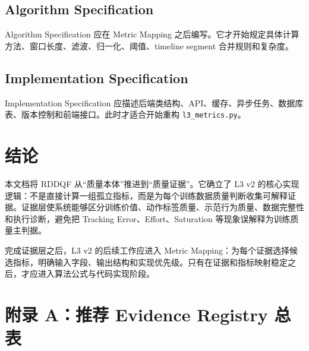 \documentclass[UTF8,zihao=-4]{ctexart}
\newcommand{\Code}[1]{\texttt{#1}}
\begin{document}
\subsection{Algorithm Specification}

Algorithm Specification 应在 Metric Mapping 之后编写。它才开始规定具体计算方法、窗口长度、滤波、归一化、阈值、timeline segment 合并规则和复杂度。

\subsection{Implementation Specification}

Implementation Specification 应描述后端类结构、API、缓存、异步任务、数据库表、版本控制和前端接口。此时才适合开始重构 \Code{l3\_metrics.py}。

\section{结论}

本文档将 RDDQF 从“质量本体”推进到“质量证据”。它确立了 L3 v2 的核心实现逻辑：不是直接计算一组孤立指标，而是为每个训练数据质量判断收集可解释证据。证据层使系统能够区分训练价值、动作标签质量、示范行为质量、数据完整性和执行诊断，避免把 Tracking Error、Effort、Saturation 等现象误解释为训练质量主判据。

完成证据层之后，L3 v2 的后续工作应进入 Metric Mapping：为每个证据选择候选指标，明确输入字段、输出结构和实现优先级。只有在证据和指标映射稳定之后，才应进入算法公式与代码实现阶段。

\appendix
\section{附录 A：推荐 Evidence Registry 总表}
\end{document}
